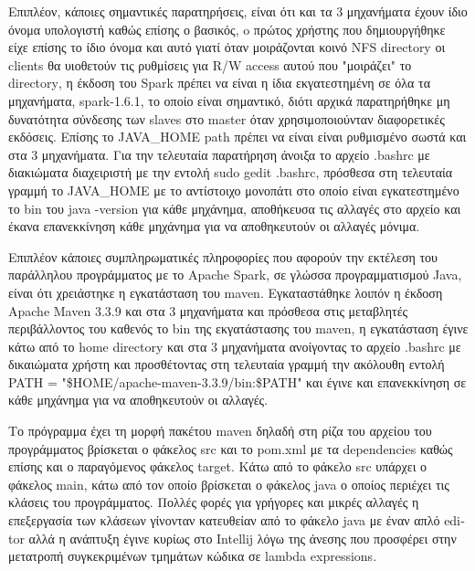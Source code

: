 \documentclass{report}
\begin{document}
Επιπλέον, κάποιες σημαντικές παρατηρήσεις, είναι ότι και τα 3 μηχανήματα έχουν ίδιο όνομα υπολογιστή καθώς επίσης ο βασικός, o πρώτος χρήστης που δημιουργήθηκε είχε επίσης το ίδιο όνομα και αυτό γιατί όταν μοιράζονται κοινό \textlatin{NFS directory} οι \textlatin{clients} θα υιοθετούν τις ρυθμίσεις για \textlatin{R/W access} αυτού που "μοιράζει" το \textlatin{directory}, η έκδοση του \textlatin{Spark} πρέπει να είναι η ίδια  εκγατεστημένη σε όλα τα μηχανήματα, \textlatin{spark-1.6.1}, το οποίο είναι σημαντικό, διότι αρχικά παρατηρήθηκε μη δυνατότητα σύνδεσης των \textlatin{slaves} στο \textlatin{master} όταν χρησιμοποιούνταν διαφορετικές εκδόσεις. Επίσης το  \textlatin{JAVA\_HOME path} πρέπει να είναι είναι ρυθμισμένο σωστά και στα 3 μηχανήματα. Για την τελευταία παρατήρηση άνοιξα το αρχείο  \textlatin{.bashrc} με διακιώματα διαχειριστή με την εντολή  \textlatin{sudo gedit .bashrc}, πρόσθεσα στη τελευταία γραμμή το \textlatin{JAVA\_HOME} με το αντίστοιχο μονοπάτι στο οποίο είναι εγκατεστημένο το \textlatin{bin} του \textlatin{java -version} για κάθε μηχάνημα, αποθήκευσα τις αλλαγές στο αρχείο και έκανα επανεκκίνηση κάθε μηχάνημα για να αποθηκευτούν οι αλλαγές μόνιμα.

Επιπλέον κάποιες συμπληρωματικές πληροφορίες που αφορούν την εκτέλεση του παράλληλου προγράμματος με το \textlatin{Apache Spark}, σε γλώσσα προγραμματισμού \textlatin{Java}, είναι ότι χρειάστηκε η εγκατάσταση του \textlatin{maven}. Εγκαταστάθηκε λοιπόν η έκδοση \textlatin{Apache Maven} 3.3.9 και στα 3 μηχανήματα και πρόσθεσα στις μεταβλητές περιβάλλοντος του καθενός το \textlatin{bin} της εκγατάστασης του \textlatin{maven}, η εγκατάσταση έγινε κάτω από το \textlatin{home  directory} και στα 3 μηχανήματα ανοίγοντας το αρχείο \textlatin{.bashrc} με δικαιώματα χρήστη και προσθέτοντας στη τελευταία γραμμή την ακόλουθη εντολή \textlatin{PATH} = \textlatin{"\$HOME/apache-maven-3.3.9/bin:\$PATH"} και έγινε και επανεκκίνηση σε κάθε μηχάνημα για να αποθηκευτούν οι αλλαγές. 

Το πρόγραμμα έχει τη μορφή πακέτου \textlatin{maven} δηλαδή στη ρίζα του αρχείου του προγράμματος βρίσκεται ο φάκελος \textlatin{src} και το \textlatin{pom.xml} με τα \textlatin{dependencies} καθώς επίσης και ο παραγόμενος φάκελος \textlatin{target}. Κάτω από το φάκελο \textlatin{src} υπάρχει ο φάκελος \textlatin{main}, κάτω από τον οποίο βρίσκεται ο φάκελος \textlatin{java} ο οποίος περιέχει τις κλάσεις του προγράμματος. Πολλές φορές για γρήγορες και μικρές αλλαγές η επεξεργασία των κλάσεων γίνονταν κατευθείαν από το φάκελο \textlatin{java} με έναν απλό \textlatin{editor} αλλά η ανάπτυξη έγινε κυρίως στο \textlatin{Intellij} λόγω της άνεσης που προσφέρει στην μετατροπή συγκεκριμένων τμημάτων κώδικα σε \textlatin{lambda} \textlatin{expressions}. 
\vspace{20mm}
\end{document}
